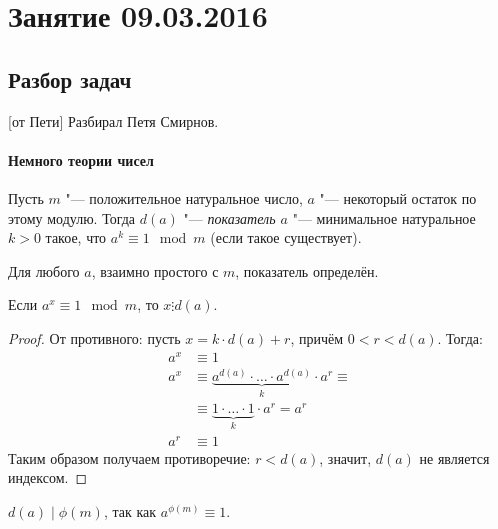 \chapter{Занятие 09.03.2016}

\section{Разбор задач}
[от Пети]
	Разбирал Петя Смирнов.

	\subsubsection{Немного теории чисел}
		\begin{Def}
			Пусть $m$ "--- положительное натуральное число, $a$ "--- некоторый остаток по этому модулю.
			Тогда $d(a)$ "--- \textit{показатель $a$} "--- минимальное натуральное $k>0$ такое,
			что $a^k \equiv 1 \mod m$ (если такое существует).
		\end{Def}
		\begin{Rem}
			Для любого $a$, взаимно простого с $m$, показатель определён.
		\end{Rem}
		\begin{assertion}
			Если $a^x \equiv 1 \mod m$, то $x \vdots d(a)$.
		\end{assertion}
		\begin{proof}
			От противного: пусть $x=k\cdot d(a) + r$, причём $0 < r < d(a)$.
			Тогда:
			\begin{align*}
				a^x &\equiv 1 \\
				a^x &\equiv \underbrace{a^{d(a)} \cdot \dots \cdot a^{d(a)}}_{k} \cdot a^r \equiv \\
				&\equiv \underbrace{1 \cdot \dots \cdot 1}_{k} \cdot a^r = a^r \\
				a^r &\equiv 1
			\end{align*}
			Таким образом получаем противоречие: $r<d(a)$, значит, $d(a)$ не является индексом.
		\end{proof}
		\begin{conseq}
			$d(a)\mid\phi(m)$, так как $a^{\phi(m)} \equiv 1$.
		\end{conseq}

